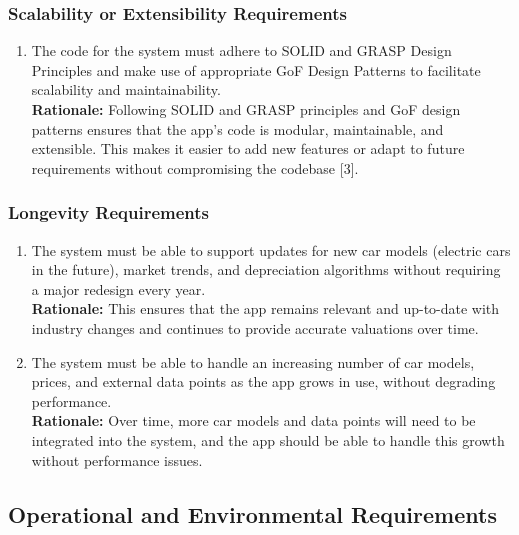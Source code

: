 \documentclass[]{article}
\begin{document}
\subsubsection{Scalability or Extensibility Requirements}
\label{ssub:scalability_or_extensibility_requirements}
\begin{enumerate}[{PR-SE}1.]
    \item The code for the system must adhere to SOLID and GRASP Design Principles and make use of appropriate GoF Design Patterns to facilitate scalability and maintainability.  \\
    \textbf{Rationale:} Following SOLID and GRASP principles and GoF design patterns ensures that the app's code is modular, maintainable, and extensible. This makes it easier to add new features or adapt to future requirements without compromising the codebase [3].
\end{enumerate}

\subsubsection{Longevity Requirements}
\label{ssub:longevity_requirements}
\begin{enumerate}[{PR-L}1.]
    \item The system must be able to support updates for new car models (electric cars in the future), market trends, and depreciation algorithms without requiring a major redesign every year.  \\
    \textbf{Rationale:} This ensures that the app remains relevant and up-to-date with industry changes and continues to provide accurate valuations over time.

    \item The system must be able to handle an increasing number of car models, prices, and external data points as the app grows in use, without degrading performance.  \\
    \textbf{Rationale:} Over time, more car models and data points will need to be integrated into the system, and the app should be able to handle this growth without performance issues.
\end{enumerate}


\subsection{Operational and Environmental Requirements}
\label{sub:operational_and_environmental_requirements}
\end{document}
